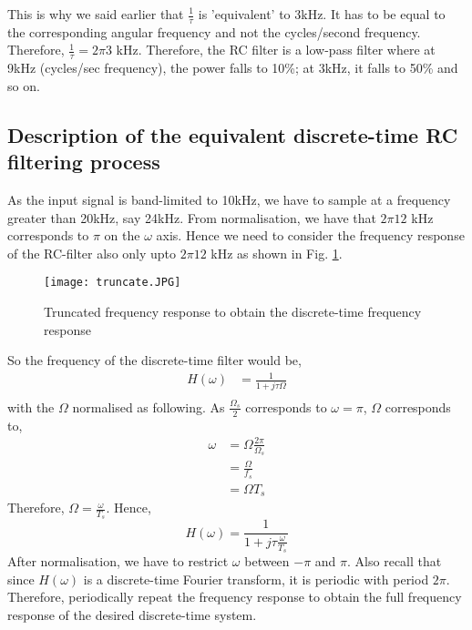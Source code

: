 This is why we said earlier that $\frac{1}{\tau}$ is 'equivalent' to 3kHz. It has to be equal to the corresponding angular frequency and not the cycles/second frequency. Therefore, $\frac{1}{\tau} = 2\pi 3$ kHz. Therefore, the RC filter is a low-pass filter where at 9kHz (cycles/sec frequency), the power falls to 10\%; at 3kHz, it falls to 50\% and so on. 

\subsection{Description of the equivalent discrete-time RC filtering process}
As the input signal is band-limited to 10kHz, we have to sample at a frequency greater than 20kHz, say 24kHz. From normalisation, we have that $2\pi12$ kHz corresponds to $\pi$ on the $\omega$ axis. Hence we need to consider the frequency response of the RC-filter also only upto $2\pi12$ kHz as shown in Fig. \ref{truncate}.
\begin{figure}[h] 
        \centering
        
                \texttt{[image: truncate.JPG]}
                \caption{Truncated frequency response to obtain the discrete-time frequency response}
                \label{truncate}
        
\end{figure}
So the frequency of the discrete-time filter would be,
\begin{equation}
\begin{split}
H(\omega) & = \frac{1}{1 + j\tau\Omega}\\
\end{split}
\end{equation}
with the $\Omega$ normalised as following. As $\frac{\Omega_{s}}{2}$ corresponds to $\omega = \pi$, $\Omega$ corresponds to,
\begin{equation}
\begin{split}
\omega & = \Omega\frac{2\pi}{\Omega_{s}}\\
        & = \frac{\Omega}{f_{s}} \\   
        & = \Omega T_{s}
\end{split}
\end{equation}
Therefore, $\Omega = \frac{\omega}{T_{s}}$. Hence,
\begin{equation}
H(\omega)  = \frac{1}{1 + j\tau\frac{\omega}{T_{s}}}
\end{equation}
After normalisation, we have to restrict $\omega$ between $-\pi$ and $\pi$. Also recall that since $H(\omega)$ is a discrete-time Fourier transform, it is periodic with period $2\pi$. Therefore, periodically repeat the frequency response to obtain the full frequency response of the desired discrete-time system. 
